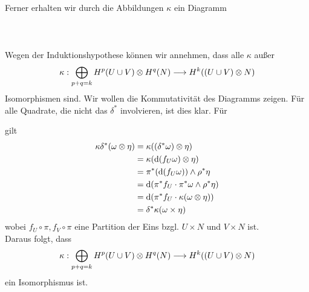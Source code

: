 \begin{Beweis}{}
\begin{center}
\end{center}
Ferner erhalten wir durch die Abbildungen $\kappa$ ein Diagramm\\\\
\\\\
Wegen der Induktionshypothese können wir annehmen, dass alle $\kappa$ außer
\[ \kappa : \bigoplus\limits_{p+q = k}H^p(U\cup V)\otimes H^q(N) \overset{}{\longrightarrow} H^k((U\cup V) \otimes N) \]
Isomorphismen sind. Wir wollen die Kommutativität des Diagramms zeigen. Für alle Quadrate, die nicht das $\delta^*$ involvieren, ist dies klar. Für
\begin{center}
\end{center}
gilt
\begin{align*}
\kappa \delta^*(\omega \otimes \eta) 
&= \kappa((\delta^*\omega) \otimes \eta)\\
&= \kappa(\text{d} (f_U\omega) \otimes \eta )\\
&= \pi^*(\text{d} (f_U\omega)) \wedge \rho^*\eta\\
&= \text{d} (\pi^*f_U \cdot \pi^*\omega \wedge \rho^*\eta)\\
&= \text{d} (\pi^*f_U \cdot \kappa(\omega \otimes \eta))\\
&= \delta^*\kappa(\omega \times \eta)
\end{align*}
wobei $f_U\circ \pi, f_V \circ \pi$ eine Partition der Eins bzgl. $U\times N$ und $V\times N$ ist.\\
Daraus folgt, dass
\[ \kappa : \bigoplus\limits_{p+q = k}H^p(U\cup V)\otimes H^q(N) \overset{}{\longrightarrow} H^k((U\cup V) \otimes N) \]
ein Isomorphismus ist.
\end{Beweis}


